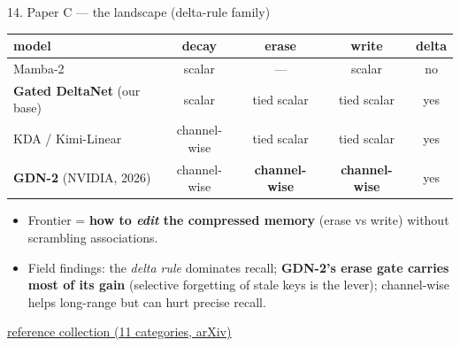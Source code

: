 \documentclass[aspectratio=169]{beamer}
\newcommand{\ghbase}{https://github.com/BDeMo/research-notes/blob/main/notes/plans/08-compressed-context-memory}
\newcommand{\ghC}[2]{\href{\ghbase/papers/paper-c-linear-attention/#1}{\color{blue}\underline{#2}}}
\newcommand{\best}[1]{\textbf{#1}}
\begin{document}
\begin{frame}{14. Paper C --- the landscape (delta-rule family)}
  \centering\scriptsize
  \begin{tabular}{lcccc}
  \toprule
  model & decay & erase & write & delta \\
  \midrule
  Mamba-2 & scalar & --- & scalar & no \\
  \textbf{Gated DeltaNet} (our base) & scalar & tied scalar & tied scalar & yes \\
  KDA / Kimi-Linear & channel-wise & tied scalar & tied scalar & yes \\
  \textbf{GDN-2} (NVIDIA, 2026) & channel-wise & \best{channel-wise} & \best{channel-wise} & yes \\
  \bottomrule
  \end{tabular}
  \vspace{0.5em}
  \begin{itemize}\footnotesize
    \item Frontier = \best{how to \emph{edit} the compressed memory} (erase vs write) without scrambling associations.
    \item Field findings: the \emph{delta rule} dominates recall; \best{GDN-2's erase gate carries most of its gain} (selective forgetting of stale keys is the lever); channel-wise helps long-range but can hurt precise recall.
  \end{itemize}
  \begin{block}{}\footnotesize \ghC{references-linear-attention.md}{reference collection (11 categories, arXiv)}\end{block}
\end{frame}
\end{document}
